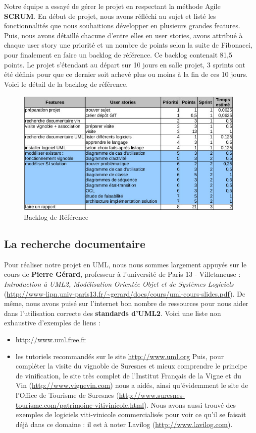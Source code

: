 \documentclass[a4paper, titlepage]{report}
\begin{document}
Notre équipe a essayé de gérer le projet en respectant la méthode Agile
\textbf{SCRUM}. En début de projet, nous avons réfléchi au sujet et
listé les fonctionnalités que nous souhaitions développer en plusieurs
grandes features. Puis, nous avons détaillé chacune d'entre elles en
user stories, avons attribué à chaque user story une priorité et un
nombre de points selon la suite de Fibonacci, pour finalement en faire
un backlog de référence. Ce backlog contenait 81,5 points. Le projet
s'étendant au départ sur 10 jours en salle projet, 3 sprints ont été
définis pour que ce dernier soit achevé plus ou moins à la fin de ces 10
jours. Voici le détail de la backlog de référence.

\begin{figure}[!h]
\centering
\includegraphics{Images/GestionProjet.jpg}
\caption{Backlog de Référence}
\end{figure}

\subsection{La recherche documentaire}\label{la-recherche-documentaire}

Pour réaliser notre projet en UML, nous nous sommes largement appuyés
sur le cours de \textbf{Pierre Gérard}, professeur à l'université de
Paris 13 - Villetaneuse : \emph{Introduction à UML2, Modélisation
Orientée Objet et de Systèmes Logiciels}
(\url{http://www-lipn.univ-paris13.fr/~gerard/docs/cours/uml-cours-slides.pdf}).
De même, nous avons puisé sur l'internet bon nombre de ressources pour
nous aider dans l'utilisation correcte des \textbf{standards d'UML2}.
Voici une liste non exhaustive d'exemples de liens : 
\begin{itemize}
\item \url{http://www.uml.free.fr}
\item les tutoriels recommandés sur le site
\url{http://www.uml.org} Puis, pour compléter la visite du vignoble de
Suresnes et mieux comprendre le principe de vinification, le site très
complet de l'Institut Français de la Vigne et du Vin
(\url{http://www.vignevin.com}) nous a aidés, ainsi qu'évidemment le
site de l'Office de Tourisme de Suresnes
(\url{http://www.suresnes-tourisme.com/patrimoine-vitivinicole.html}).
Nous avons aussi trouvé des exemples de logiciels viti-vinicole
commercialisés pour voir ce qu'il se faisait déjà dans ce domaine : il
est à noter Lavilog (\url{http://www.lavilog.com}).
\end{itemize}
\end{document}
